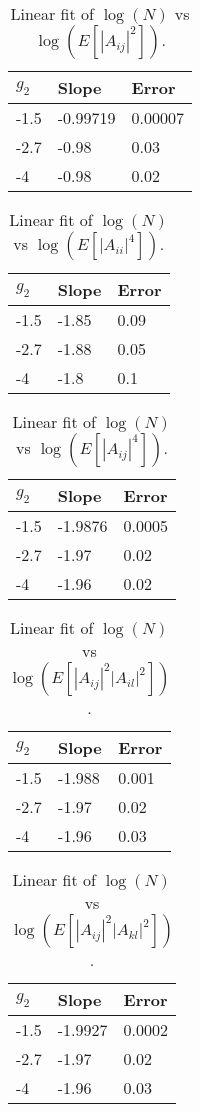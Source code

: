 \documentclass[12pt,a4paper]{article}
\begin{document}
\begin{table}[hp]
\centering
\begin{tabular}{|l|l|l|}
\hline
$g_2$ & Slope & Error \\ \hline
-1.5 & -0.99719 & 0.00007 \\ \hline
-2.7 & -0.98 & 0.03 \\ \hline
-4 & -0.98 & 0.02 \\ \hline
\end{tabular}
\caption{Linear fit of $\log(N)$ vs $\log(E[ |A_{ij}|^2 ])$.}
\label{tab:NA2ijexp}
\end{table}
\begin{table}[hp]
\centering
\begin{tabular}{|l|l|l|}
\hline
$g_2$ & Slope & Error \\ \hline
-1.5 & -1.85 & 0.09 \\ \hline
-2.7 & -1.88 & 0.05 \\ \hline
-4 & -1.8 & 0.1 \\ \hline
\end{tabular}
\caption{Linear fit of $\log(N)$ vs $\log(E[ |A_{ii}|^4 ])$.}
\label{tab:NA4iiexp}
\end{table}
\begin{table}[hp]
\centering
\begin{tabular}{|l|l|l|}
\hline
$g_2$ & Slope & Error \\ \hline
-1.5 & -1.9876 & 0.0005 \\ \hline
-2.7 & -1.97 & 0.02 \\ \hline
-4 & -1.96 & 0.02 \\ \hline
\end{tabular}
\caption{Linear fit of $\log(N)$ vs $\log(E[ |A_{ij}|^4 ])$.}
\label{tab:NA4ijexp}
\end{table}
\newpage
\begin{table}[hp]
\centering
\begin{tabular}{|l|l|l|}
\hline
$g_2$ & Slope & Error \\ \hline
-1.5 & -1.988 & 0.001 \\ \hline
-2.7 & -1.97 & 0.02 \\ \hline
-4 & -1.96 & 0.03 \\ \hline
\end{tabular}
\caption{Linear fit of $\log(N)$ vs $\log(E[ |A_{ij}|^2  |A_{il}|^2   ])$.}
\label{tab:NAijil}
\end{table}
\begin{table}[hp]
\centering
\begin{tabular}{|l|l|l|}
\hline
$g_2$ & Slope & Error \\ \hline
-1.5 & -1.9927 & 0.0002 \\ \hline
-2.7 & -1.97 & 0.02 \\ \hline
-4 & -1.96 & 0.03 \\ \hline
\end{tabular}
\caption{Linear fit of $\log(N)$ vs $\log(E[ |A_{ij}|^2  |A_{kl}|^2   ])$.}
\label{tab:NAijkl}
\end{table}
\end{document}
